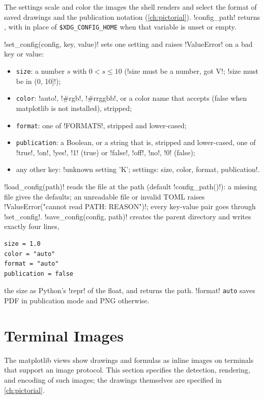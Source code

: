 The settings scale and color the images the shell renders and select the format of saved drawings and the publication notation (\cref{ch:pictorial}). \py!config_path! returns , with  in place of \texttt{\$XDG\_CONFIG\_HOME} when that variable is unset or empty.

\py!set_config(config, key, value)! sets one setting and raises \py!ValueError! on a bad key or value:
\begin{itemize}
\item \texttt{size}: a number $s$ with $0<s\le10$ (\code!size must be a number, got V!; \code!size must be in (0, 10]!);
\item \texttt{color}: \code!auto!, \code!#rgb!, \code!#rrggbb!, or a color name that  accepts (false when matplotlib is not installed), stripped;
\item \texttt{format}: one of \py!FORMATS!, stripped and lower-cased;
\item \texttt{publication}: a Boolean, or a string that is, stripped and lower-cased, one of \code!true!, \code!on!, \code!yes!, \code!1! (true) or \code!false!, \code!off!, \code!no!, \code!0! (false);
\item any other key: \code!unknown setting 'K'; settings: size, color, format, publication!.
\end{itemize}

\py!load_config(path)! reads the  file at the path (default \py!config_path()!): a missing file gives the defaults; an unreadable file or invalid TOML raises \code!ValueError("cannot read PATH: REASON")!; every key-value pair goes through \py!set_config!. \py!save_config(config, path)! creates the parent directory and writes exactly four lines,
\begin{lstlisting}[style=grammar]
size = 1.0
color = "auto"
format = "auto"
publication = false
\end{lstlisting}
the size as Python's \py!repr! of the float, and returns the path. \py!format! \texttt{auto} saves PDF in publication mode and PNG otherwise.

\section{Terminal Images}\label{sec:shell-terminal}

The matplotlib views show drawings and formulas as inline images on terminals that support an image protocol. This section specifies the detection, rendering, and encoding of such images; the drawings themselves are specified in \cref{ch:pictorial}.

